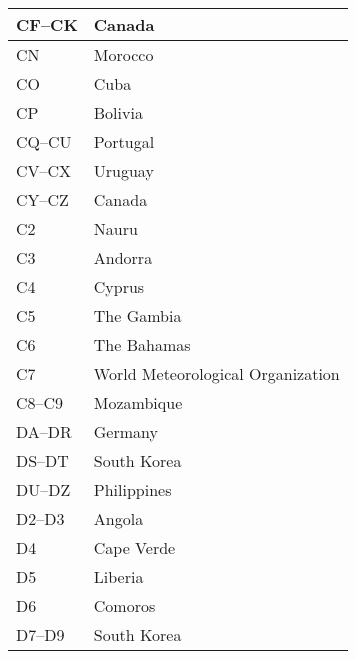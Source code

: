 \begin{longtable}{|l|l|}
  \hline
  CF--CK              & Canada                                    \\
  \hline
  CN                  & Morocco                                   \\
  \hline
  CO                  & Cuba                                      \\
  \hline
  CP                  & Bolivia                                   \\
  \hline
  CQ--CU              & Portugal                                  \\
  \hline
  CV--CX              & Uruguay                                   \\
  \hline
  CY--CZ              & Canada                                    \\
  \hline
  C2                  & Nauru                                     \\
  \hline
  C3                  & Andorra                                   \\
  \hline
  C4                  & Cyprus                                    \\
  \hline
  C5                  & The Gambia                                \\
  \hline
  C6                  & The Bahamas                               \\
  \hline
  C7                  & World Meteorological Organization         \\
  \hline
  C8--C9              & Mozambique                                \\
  \hline
  DA--DR              & Germany                                   \\
  \hline
  DS--DT              & South Korea                               \\
  \hline
  DU--DZ              & Philippines                               \\
  \hline
  D2--D3              & Angola                                    \\
  \hline
  D4                  & Cape Verde                                \\
  \hline
  D5                  & Liberia                                   \\
  \hline
  D6                  & Comoros                                   \\
  \hline
  D7--D9              & South Korea                               \\
  \hline

\end{longtable}
